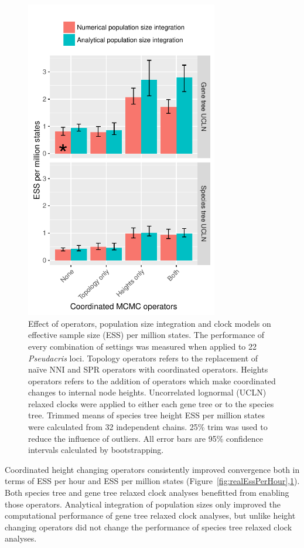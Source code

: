 \documentclass[12pt]{article}
\begin{document}
\begin{figure}[htb!]
\centering
\includegraphics[height=14cm]{speciesTreeHeight_ess_per_mstates.pdf}
\caption
{Effect of operators, population size integration and clock models on effective
sample size (ESS) per million states. The performance of every combination of
settings was measured when applied to 22 \textit{Pseudacris} loci. Topology operators refers to the
replacement of na\"ive NNI and SPR operators with coordinated operators. Heights
operators refers to the addition of operators which make coordinated changes to
internal node heights. Uncorrelated lognormal (UCLN) relaxed clocks were applied
to either each gene tree or to the species tree. Trimmed means
of species tree height ESS per million states were calculated from 32
independent chains. 25\% trim was used to reduce the influence
of outliers. All error bars are 95\% confidence intervals calculated by
bootstrapping.}
\label{fig:realEssPerMstates}
\end{figure}

Coordinated height changing operators consistently improved convergence both in
terms of ESS per hour and ESS per million states
(Figure~\ref{fig:realEssPerHour},\ref{fig:realEssPerMstates}). Both species tree
and gene tree relaxed clock analyses benefitted from enabling those operators.
Analytical integration of population sizes only improved the computational
performance of gene tree relaxed clock analyses, but unlike height changing
operators did not change the performance of species tree relaxed clock analyses.
\end{document}
